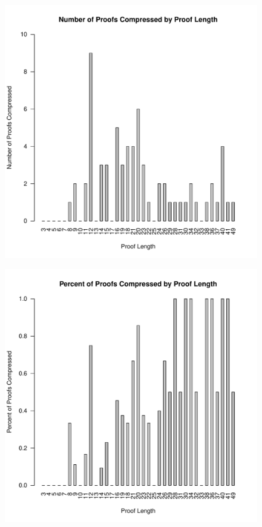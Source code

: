 \begin{figure}
\includegraphics[scale=0.5]{images/num_compressed_count.pdf}
\end{figure}
\begin{figure}
\includegraphics[scale=0.5]{images/num_compressed_percent.pdf}
\end{figure}
